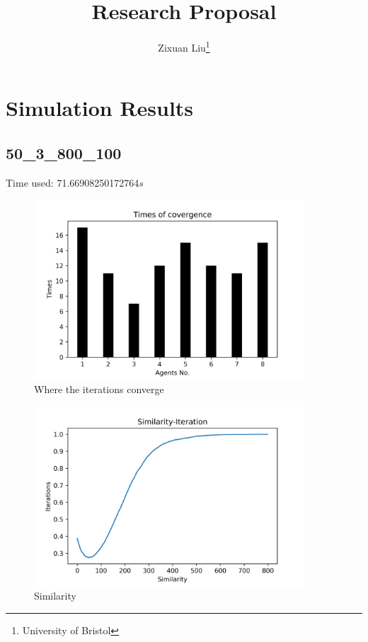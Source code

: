 \documentclass[a4paper,12pt]{article}
\title{Research Proposal}
\author{Zixuan Liu\thanks{University of Bristol}}
\begin{document}
	\section{Simulation Results}
	\subsection{50\_3\_800\_100}
	Time used: 71.66908250172764${s}$
	\begin{figure}[H]
		\centering
		\includegraphics[width=0.9\textwidth]{agt50_3_800_100}
		\caption{Where the iterations converge}\label{agt50_3_800_100}
	\end{figure}
%
	\begin{figure}[H]
		\centering
		\includegraphics[width=0.9\textwidth]{Sim50_3_800_100}
		\caption{Similarity}\label{Sim50_3_800_100}
	\end{figure}
%
\end{document}
